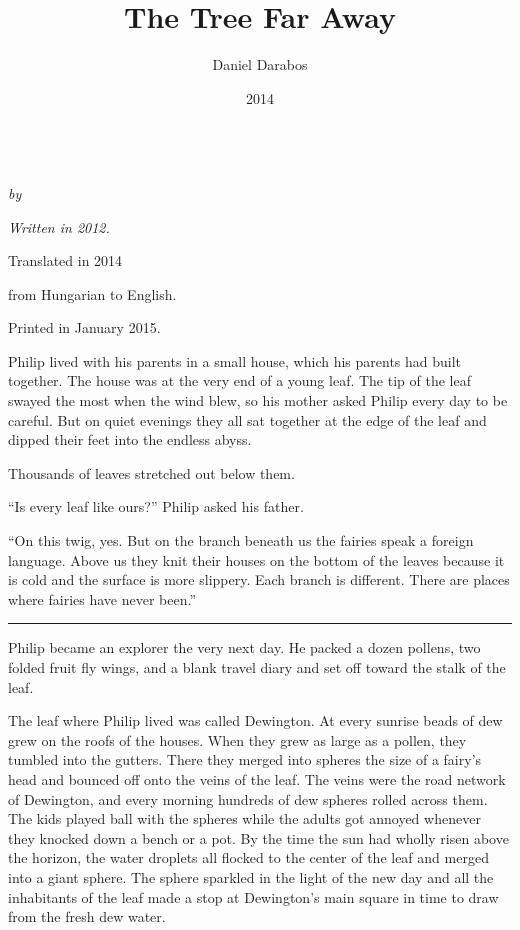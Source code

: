 \documentclass[10pt]{memoir}
\author{Daniel Darabos}
\date{2014}
\title{The Tree Far Away}
\renewcommand{\pfbreakdisplay}{\bigskip \ding{166} \bigskip}
\newcommand{\secbreak}{\fancybreak{\pfbreakdisplay}}
\begin{document}
\begin{titlingpage}
  \centering
  \vspace*{0.2\textheight}
  {\Huge \thetitle}\\[\baselineskip]
  {\large\itshape by \theauthor}\\[\baselineskip]
  \vfill
  {\itshape Written in 2012. \par
  Translated in 2014 \par from Hungarian to English. \par
  Printed in January 2015.}
  \vspace*{0.1\textheight}
\end{titlingpage}

\vspace*{0.4\textheight}
\noindent
Philip lived with his parents in a small house, which his parents had built
together. The house was at the very end of a young leaf. The tip of the leaf
swayed the most when the wind blew, so his mother asked Philip every day to be
careful. But on quiet evenings they all sat together at the edge of the leaf
and dipped their feet into the endless abyss.

Thousands of leaves stretched out below them.

``Is every leaf like ours?'' Philip asked his father.

``On this twig, yes. But on the branch beneath us the fairies speak a foreign
language. Above us they knit their houses on the bottom of the leaves because
it is cold and the surface is more slippery. Each branch is different. There
are places where fairies have never been.''

\secbreak

Philip became an explorer the very next day. He packed a dozen pollens, two
folded fruit fly wings, and a blank travel diary and set off toward the stalk of
the leaf.

The leaf where Philip lived was called Dewington. At every sunrise beads of dew
grew on the roofs of the houses. When they grew as large as a pollen, they
tumbled into the gutters. There they merged into spheres the size of a fairy's
head and bounced off onto the veins of the leaf. The veins were the road
network of Dewington, and every morning hundreds of dew spheres rolled across
them. The kids played ball with the spheres while the adults got annoyed
whenever they knocked down a bench or a pot. By the time the sun had wholly
risen above the horizon, the water droplets all flocked to the center of the
leaf and merged into a giant sphere. The sphere sparkled in the light of the
new day and all the inhabitants of the leaf made a stop at Dewington's main
square in time to draw from the fresh dew water.
\end{document}
